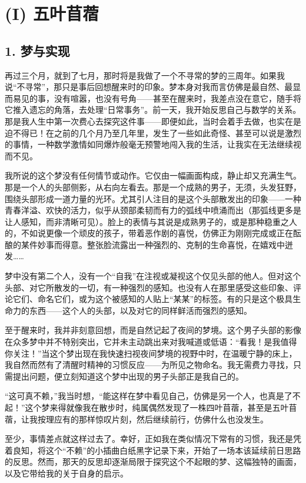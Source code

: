 \section{(I) 五叶苜蓿}

\subsection{1. 梦与实现}

再过三个月，就到了七月，那时将是我做了一个不寻常的梦的三周年。如果我说“不寻常”，那只是事后回想醒来时的印象。梦本身对我而言仿佛是最自然、最显而易见的事，没有喧嚣，也没有号角——甚至在醒来时，我差点没在意它，随手将它推入遗忘的角落，去处理“日常事务”。前一天，我开始反思自己与数学的关系。那是我人生中第一次费心去探究这件事——即便如此，当时会着手去做，也实在是迫不得已！在之前的几个月乃至几年里，发生了一些如此奇怪、甚至可以说是激烈的事情，一种数学激情如同爆炸般毫无预警地闯入我的生活，让我实在无法继续视而不见。

我所说的这个梦没有任何情节或动作。它仅由一幅画面构成，静止却又充满生气。那是一个人的头部侧影，从右向左看去。那是一个成熟的男子，无须，头发狂野，围绕头部形成一道力量的光环。尤其引人注目的是这个头部散发出的印象——一种青春洋溢、欢快的活力，似乎从颈部柔韧而有力的弧线中喷涌而出（那弧线更多是让人感知，而非清晰可见）。脸上的表情与其说是成熟男子的，或是那种稳重之人的，不如说更像一个顽皮的孩子，带着恶作剧的喜悦，仿佛正为刚刚完成或正在酝酿的某件妙事而得意。整张脸流露出一种强烈的、克制的生命喜悦，在嬉戏中迸发……

梦中没有第二个人，没有一个“自我”在注视或凝视这个仅见头部的他人。但对这个头部、对它所散发的一切，有一种强烈的感知。也没有人在那里感受这些印象、评论它们、命名它们，或为这个被感知的人贴上“某某”的标签。有的只是这个极具生命力的东西——这个人的头部，以及对它的同样鲜活而强烈的感知。

至于醒来时，我并非刻意回想，而是自然记起了夜间的梦境。这个男子头部的影像在众多梦中并不特别突出，它并未主动跳出来对我喊道或低语：“看我！是我值得你关注！”当这个梦出现在我快速扫视夜间梦境的视野中时，在温暖宁静的床上，我自然而然有了清醒时精神的习惯反应——为所见之物命名。我无需费力寻找，只需提出问题，便立刻知道这个梦中出现的男子头部正是我自己的。

“这可真不赖，”我当时想，“能这样在梦中看见自己，仿佛是另一个人，也真是了不起！”这个梦来得就像我在散步时，纯属偶然发现了一株四叶苜蓿，甚至是五叶苜蓿，让我按理应有的那样惊叹片刻，然后继续前行，仿佛什么也没发生。

至少，事情差点就这样过去了。幸好，正如我在类似情况下常有的习惯，我还是凭着良知，将这个“不赖”的小插曲白纸黑字记录下来，开始了一场本该延续前日思路的反思。然而，那天的反思却逐渐局限于探究这个不起眼的梦、这幅独特的画面，以及它带给我的关于自身的启示。

